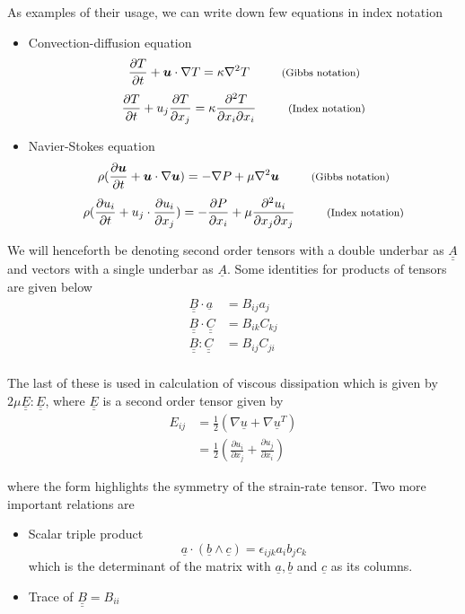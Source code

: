 \documentclass[11pt, letterpaper]{article}
\newcommand{\e}{\epsilon}
\newcommand{\1}{\bm{1}}
\newcommand{\pd}[2]{\frac{\partial #1}{\partial #2}}
\newcommand{\uu}[1]{\underline{\underline{#1}}}
\newcommand{\un}[1]{\underline{#1}}
\begin{document}
As examples of their usage, we can write down few equations in index notation
\begin{itemize}
  \item Convection-diffusion equation
$$\pd{T}{t} + \bm{u}\cdot \nabla T = \kappa \nabla^2 T \hfill \text{\footnotesize{\quad \quad \quad     (Gibbs notation)}}$$
$$\pd{T}{t} + u_j\pd{T}{x_j} = \kappa \pd{^2T}{x_i \partial x_i} \hfill \text{\footnotesize{\quad \quad \quad     (Index notation)}}$$

  \item Navier-Stokes equation
$$\rho(\pd{\bm{u}}{t} + \bm{u}\cdot\nabla\bm{u}) = -\nabla P +\mu \nabla^2 \bm{u} \text{\footnotesize{\quad \quad \quad     (Gibbs notation)}}$$
$$\rho(\pd{u_i}{t} + u_j\cdot\pd{u_i}{x_j}) = -\pd{P}{x_i} +\mu \frac{\partial^2 u_i}{\partial x_j \partial x_j} \text{\footnotesize{\quad \quad \quad     (Index notation)}}$$

\end{itemize}

We will henceforth be denoting second order tensors with a double underbar as $\uu{A}$ and vectors with a single underbar as $\un{A}$. Some identities for products of tensors are given below
\begin{align*}
\uu{B}\cdot \un{a} &= B_{ij} a_j \\
\uu{B} \cdot \uu{C} &= B_{ik}C_{kj} \\
\uu{B} \colon \uu{C} &= B_{ij}C_{ji} \\
\end{align*}

The last of these is used in calculation of viscous dissipation which is given by $2\mu\uu{E}\colon\uu{E}$, where $\uu{E}$ is a second order tensor given by
\begin{align*}
E_{ij} &= \frac{1}{2}(\nabla \un{u} + \nabla \un{u}^T)\\
&=\frac{1}{2}(\pd{u_i}{x_j} + \pd{u_j}{x_i})
\end{align*}

where the form highlights the symmetry of the strain-rate tensor. Two more important relations are
\begin{itemize}
  \item Scalar triple product
$$\un{a}\cdot(\un{b}\wedge\un{c}) = \e_{ijk}a_ib_jc_k$$
which is the determinant of the matrix with $\un{a},\un{b}$ and $\un{c}$ as its columns.

  \item Trace of $\uu{B} = B_{ii}$
\end{itemize}
\end{document}

